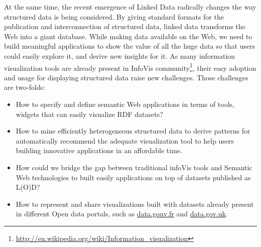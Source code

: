 
At the same time, the recent emergence of Linked Data radically changes the way structured data is being considered. By giving standard formats for the publication and interconnection of structured data, linked data transforms the Web into a giant database. While making data available on the Web, we need to build meaningful applications to show the value of all the huge data so that users could easily explore it, and derive new insights for it. As many information visualization tools are already present in InfoVis community\footnote{\url{http://en.wikipedia.org/wiki/Information_visualization}}, their easy adoption and usage for displaying structured data raise new challenges. Those challenges are two-folds:
\begin{itemize}
\item How to specify and define semantic Web applications in terms of tools, widgets that can easily visualize RDF datasets?
\item How to mine efficiently heterogeneous structured data to derive patterns for automatically recommend the adequate visualization tool to help users building innovative applications in an affordable time.
\item How could we bridge the gap between traditional infoVis tools and Semantic Web technologies to built easily applications on top of datasets published as L(O)D?
\item How to represent and share visualizations built with datasets already present in different Open data portals, such as \url{data.gouv.fr} and \url{data.gov.uk}.  
\end{itemize}

  

\begin{figure}[ht!]
\end{figure}


